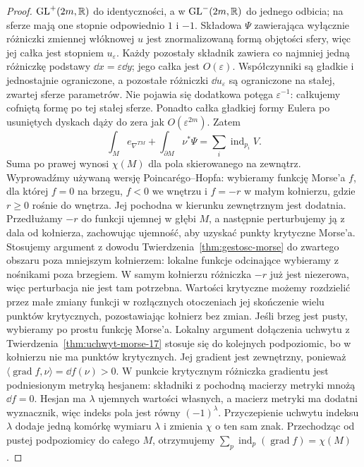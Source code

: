 \begin{proof}
$\mathrm{GL}^+(2m,\mathbb{R})$ do identyczności, a w
$\mathrm{GL}^-(2m,\mathbb{R})$ do jednego odbicia;
na sferze mają one stopnie odpowiednio $1$ i $-1$.
Składowa $\Psi$ zawierająca wyłącznie różniczki
zmiennej włóknowej $u$ jest znormalizowaną
formą objętości sfery, więc jej całka jest
stopniem $u_\varepsilon$. Każdy pozostały
składnik zawiera co najmniej jedną różniczkę
podstawy $\dd x=\varepsilon\dd y$; jego
całka jest $O(\varepsilon)$.
Współczynniki są gładkie i jednostajnie ograniczone,
a pozostałe różniczki $\dd u_\varepsilon$ są ograniczone
na stałej, zwartej sferze parametrów.
Nie pojawia się dodatkowa potęga $\varepsilon^{-1}$:
całkujemy cofniętą formę po tej stałej sferze.
Ponadto całka gładkiej formy Eulera po usuniętych
dyskach dąży do zera jak $O(\varepsilon^{2m})$.
Zatem
\[
 \int_M e_{\nabla^{TM}}
 +\int_{\partial M}\nu^*\Psi
 =\sum_i\operatorname{ind}_{p_i}V.
\]
Suma po prawej wynosi
$\chi(M)$ dla pola
skierowanego na zewnątrz.
Wyprowadźmy używaną
wersję Poincarégo--Hopfa:
wybieramy funkcję Morse'a $f$, dla której
$f=0$ na brzegu, $f<0$ we wnętrzu i $f=-r$
w małym kołnierzu, gdzie $r\geq0$ rośnie do wnętrza.
Jej pochodna w kierunku zewnętrznym jest dodatnia.
Przedłużamy $-r$ do funkcji ujemnej w głębi $M$,
a następnie perturbujemy ją z dala od kołnierza,
zachowując ujemność, aby uzyskać punkty krytyczne Morse'a.
Stosujemy argument z dowodu
Twierdzenia~\ref{thm:gestosc-morse} do zwartego obszaru
poza mniejszym kołnierzem: lokalne funkcje odcinające
wybieramy z nośnikami poza brzegiem.
W samym kołnierzu różniczka $-r$ już jest niezerowa,
więc perturbacja nie jest tam potrzebna.
Wartości krytyczne możemy rozdzielić przez małe zmiany
funkcji w rozłącznych otoczeniach jej skończenie wielu punktów
krytycznych, pozostawiając kołnierz bez zmian.
Jeśli brzeg jest pusty, wybieramy po prostu funkcję Morse'a.
Lokalny argument
dołączenia uchwytu z
Twierdzenia~\ref{thm:uchwyt-morse-17}
stosuje się do kolejnych podpoziomic,
bo w kołnierzu nie ma punktów krytycznych.
Jej gradient jest zewnętrzny, ponieważ
$\langle\operatorname{grad}f,\nu\rangle=\dd f(\nu)>0$.
W punkcie krytycznym różniczka gradientu jest
podniesionym metryką hesjanem:
składniki z pochodną macierzy metryki mnożą $\dd f=0$.
Hesjan ma $\lambda$ ujemnych wartości własnych,
a macierz metryki ma dodatni wyznacznik,
więc indeks pola jest równy $(-1)^\lambda$.
Przyczepienie uchwytu indeksu $\lambda$ dodaje jedną
komórkę wymiaru $\lambda$ i zmienia $\chi$ o ten sam znak.
Przechodząc od pustej podpoziomicy do całego $M$,
otrzymujemy $\sum_p\operatorname{ind}_p(\operatorname{grad}f)=\chi(M)$.


\end{proof}
